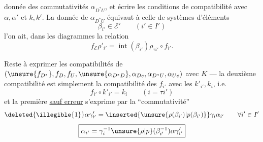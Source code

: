 
donnée des commutativités $\alpha_{D^*U}$, et écrire les conditions de compatibilité avec $\alpha,\alpha'$ et $k,k'$. La donnée de $\alpha_{D^*U}$ équivaut à celle de systèmes d'éléments
\[
\boxed{\beta_{i'}\in\mathcal E'}\qquad(i'\in I')
\]
 l'on ait, dans les diagrammes
la relation
\[
f_{\mathcal E}\rho'_{i'}=\operatorname{int}(\beta_{i'})\rho_{\tau i'}\circ f_{i'}.
\]

Reste à exprimer les  compatibilités  de
$(\unsure{f_{D^*}},f_D,f_U,\unsure{\alpha_{D^*D}},\alpha_{De},\alpha_{D^*U},\alpha_{Ue})$
  avec $K$ --- la deuxième compatibilité est simplement la compatibilité des $f_{i'}$ avec les $k'_{i'},k_i$, i.e.
\[
f_{i'}\circ k'_{i'}=k_i\qquad(i=\tau i')
\]
et la première \uline{sauf erreur} s'exprime par la ``commutativité''
\[
\deleted{\illegible{1}}\alpha\gamma'_{i'}
 =\inserted{\unsure{\rho(\beta_{i'})|p(\beta_{i'})}}\gamma_i\alpha_{i'}
 \qquad\forall i'\in I'
\]
\[
\boxed{\alpha_{i'}=\gamma_i^{-1}\unsure{\rho|p}(\beta_{i'}^{-1})\alpha\gamma'_{i'}}
\]


